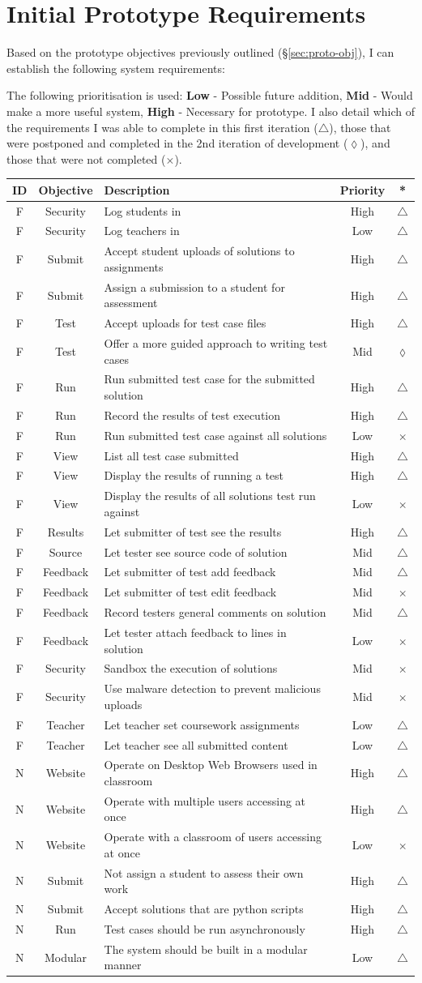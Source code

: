 \documentclass[a4paper,11pt]{report}
\newcounter{FunCount}
\newcounter{NFunCount}
\newcommand{\freq}[4]{\addtocounter{FunCount}{1}F\arabic{FunCount} & #1 & #2 & #3 & #4\\}
\newcommand{\nfreq}[4]{\addtocounter{NFunCount}{1}N\arabic{NFunCount} & #1 & #2 & #3 & #4\\}
\begin{document}
\section{Initial Prototype Requirements}
\label{sec:req1}
Based on the  prototype objectives previously outlined (\S\ref{sec:proto-obj}), I can establish the following system requirements:\par
The following prioritisation is used: \textbf{Low} - Possible future addition, \textbf{Mid} - Would make a more useful system, \textbf{High} - Necessary for prototype. I also detail which of the requirements I was able to complete in this first iteration ($\triangle$), those that were postponed and completed in the 2nd iteration of development ($\lozenge$), and those that were not completed ($\times$).
\begin{longtable}{ccl@{}cc}
\label{tab:protoreq1}
\textbf{ID} & \textbf{Objective} & \textbf{Description} & \textbf{Priority} & \textbf{*} \\\hline
\freq{Security}{Log students in}{High}{$\triangle$}
\freq{Security}{Log teachers in}{Low}{$\triangle$}
\freq{Submit}{Accept student uploads of solutions to assignments}{High}{$\triangle$}
\freq{Submit}{Assign a submission to a student for assessment}{High}{$\triangle$}
\freq{Test}{Accept uploads for test case files}{High}{$\triangle$}
\freq{Test}{Offer a more guided approach to writing test cases}{Mid}{$\lozenge$}
\freq{Run}{Run submitted test case for the submitted solution}{High}{$\triangle$}
\freq{Run}{Record the results of test execution}{High}{$\triangle$}
\freq{Run}{Run submitted test case against all solutions}{Low}{$\times$}
\freq{View}{List all test case submitted}{High}{$\triangle$}
\freq{View}{Display the results of running a test}{High}{$\triangle$}
\freq{View}{Display the results of all solutions test run against}{Low}{$\times$}
\freq{Results}{Let submitter of test see the results}{High}{$\triangle$}
\freq{Source}{Let tester see source code of solution}{Mid}{$\triangle$}
\freq{Feedback}{Let submitter of test add feedback}{Mid}{$\triangle$}
\freq{Feedback}{Let submitter of test edit feedback}{Mid}{$\times$}
\freq{Feedback}{Record testers general comments on solution}{Mid}{$\triangle$}
\freq{Feedback}{Let tester attach feedback to lines in solution}{Low}{$\times$}
\freq{Security}{Sandbox the execution of solutions}{Mid}{$\times$}
\freq{Security}{Use malware detection to prevent malicious uploads}{Mid}{$\times$}
\freq{Teacher}{Let teacher set coursework assignments}{Low}{$\triangle$}
\freq{Teacher}{Let teacher see all submitted content}{Low}{$\triangle$}
\nfreq{Website}{Operate on Desktop Web Browsers used in classroom}{High}{$\triangle$}
\nfreq{Website}{Operate with multiple users accessing at once}{High}{$\triangle$}
\nfreq{Website}{Operate with a classroom of users accessing at once}{Low}{$\times$}
\nfreq{Submit}{Not assign a student to assess their own work}{High}{$\triangle$}
\nfreq{Submit}{Accept solutions that are python scripts}{High}{$\triangle$}
\nfreq{Run}{Test cases should be run asynchronously}{High}{$\triangle$}
\nfreq{Modular}{The system should be built in a modular manner}{Low}{$\triangle$}
\end{longtable}
\end{document}
